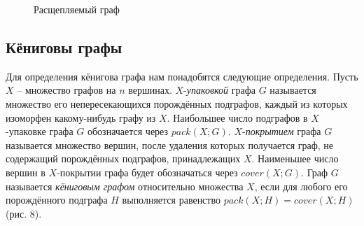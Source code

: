 \documentclass[12pt]{article}
\begin{document}
\begin{figure}
	\label{pic7}
	\caption{Расщепляемый граф}
\end{figure}
\subsection{Кёниговы графы}
Для определения кёнигова графа нам понадобятся следующие определения.
Пусть $X$ -- множество графов на $n$ вершинах. $X$-{\it упаковкой} графа $G$ называется множество его непересекающихся порождённых подграфов, каждый из которых изоморфен какому-нибудь графу из $X$. Наибольшее число подграфов в $X$-упаковке графа $G$ обозначается через $pack(X;G)$. $X$-{\it покрытием} графа $G$ называется множество вершин, после удаления которых получается граф, не содержащий порождённых подграфов, принадлежащих $X$. Наименьшее число вершин в $X$-покрытии графа будет обозначаться через $cover(X;G)$. Граф $G$ называется {\it кёниговым графом} относительно множества $X$, если для любого его порождённого подграфа $H$ выполняется равенство $pack(X;H) = cover(X;H)$ (рис. 8).
\end{document}
